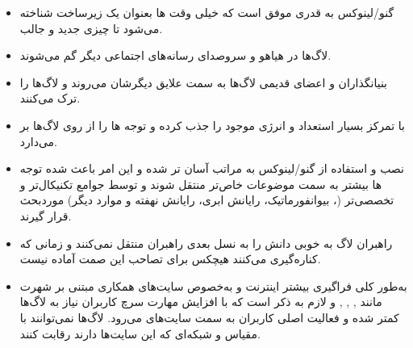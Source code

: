 \begin{itemize}
\item 
گنو/لینوکس به قدری موفق است که خیلی وقت ها بعنوان یک زیرساخت شناخته می‌شود تا چیزی جدید و جالب.

\item
لاگ‌ها در هیاهو و سروصدای رسانه‌های اجتماعی دیگر گم می‌شوند.
\item
بنیانگذاران و اعضای قدیمی لاگ‌ها به سمت علایق دیگرشان می‌روند و لاگ‌ها را ترک می‌کنند.

\item 
{}
با تمرکز بسیار استعداد و انرژی موجود را جذب کرده و توجه ها را از روی لاگ‌ها بر می‌دارد.

\item
نصب و استفاده از گنو/لینوکس به مراتب آسان تر شده و این امر باعث شده
توجه ها بیشتر به سمت موضوعات خاص‌تر منتقل شوند و توسط جوامع تکنیکال‌تر
و تخصصی‌تر‌ (، بیوانفورماتیک، رایانش ابری، رایانش نهفته و موارد دیگر)
موردبحث قرار گیرند.


\item
راهبران لاگ به خوبی دانش را به نسل بعدی راهبران منتقل نمی‌کنند و زمانی که
کناره‌گیری می‌کنند هیچکس برای تصاحب این صمت آماده نیست.

\item
به‌طور کلی فراگیری بیشتر اینترنت و به‌خصوص سایت‌های همکاری مبتنی بر شهرت
مانند
,
,
,
و
لازم‌ به ذکر است که با افزایش مهارت سرچ کاربران نیاز به لاگ‌ها کمتر شده
و فعالیت اصلی کاربران به سمت سایت‌های
می‌رود. لاگ‌ها نمی‌توانند با مقیاس و شبکه‌ای که این سایت‌ها دارند رقابت کنند.


\end{itemize}

